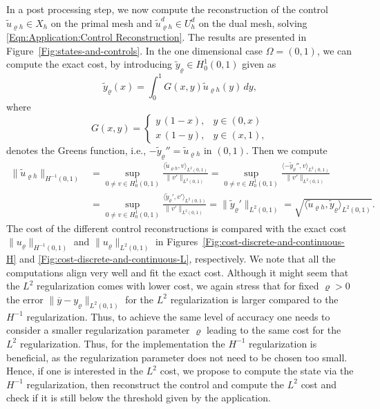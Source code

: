 \documentclass{article}
\newcommand{\norm}[1]{\|#1\|}
\numberwithin{equation}{section}
\begin{document}
In a post processing step, we now compute the reconstruction of the control
$\widetilde{u}_{\varrho h}\in X_h$ on the primal mesh and
$\widetilde{u}_{\varrho h}^d\in U_h^d$ on the
dual mesh, solving \eqref{Eqn:Application:Control Reconstruction}. The results
are presented in Figure~\ref{Fig:states-and-controls}. 
In the one dimensional case $\Omega = (0,1)$, we can compute the exact cost,
by introducing $\widetilde{y}_\varrho\in H^1_0(0,1)$ given as 
\begin{equation*}
  \widetilde{y}_\varrho(x) = \int_0^1 G(x,y)\widetilde{u}_{\varrho h}(y)\, dy, 
\end{equation*}
where
\begin{equation*}
  G(x,y) = \begin{cases}
    y \, (1-x),& y\in(0,x)\\
    x \, (1-y), & y\in(x,1),
  \end{cases}
\end{equation*}
denotes the Greens function, i.e., $-\widetilde{y}_\varrho'' =
\widetilde{u}_{\varrho h}$
in $(0,1)$. Then we compute 
\begin{align*}
  \norm{\widetilde{u}_{\varrho h}}_{H^{-1}(0,1)}
  & = \sup_{0\neq v\in H^1_0(0,1)}
    \frac{\langle \widetilde{u}_{\varrho h},v\rangle_{L^2(0,1)} }{\norm{v'}_{L^2(0,1)}}
    = \sup_{0\neq v\in H^1_0(0,1)}\frac{\langle -\widetilde{y}_\varrho'',
    v\rangle_{L^2(0,1)} }{\norm{v'}_{L^2(0,1)}}\\
  & = \sup_{0\neq v\in H^1_0(0,1)}
    \frac{\langle \widetilde{y}_\varrho',v'\rangle_{L^2(0,1)}}
    {\norm{v'}_{L^2(0,1)}}
    = \norm{\widetilde{y}_\varrho'}_{L^2(0,1)} =
    \sqrt{\langle \widetilde{u}_{\varrho h},
    \widetilde{y}_\varrho\rangle_{L^2(0,1)} }.  
\end{align*} 
The cost of the different control reconstructions is compared with the exact
cost $\norm{u_{\varrho}}_{H^{-1}(0,1)}$ and $\norm{u_\varrho}_{L^2(0,1)}$ in 
Figures~\ref{Fig:cost-discrete-and-continuous-H} and
\ref{Fig:cost-discrete-and-continuous-L}, respectively.
We note that all the computations align very well and fit the exact cost.
Although it might seem that the $L^2$ regularization comes with lower cost,
we again stress that for fixed $\varrho >0$ the error
$\norm{\overline{y}-y_{\varrho}}_{L^2(0,1)}$ for the $L^2$ regularization is
larger compared to the $H^{-1}$ regularization. Thus, to achieve the same
level of accuracy one needs to consider a smaller regularization parameter
$\varrho$ leading to the same cost for the $L^2$ regularization. Thus, for
the implementation the $H^{-1}$ regularization is beneficial, as the
regularization parameter does not need to be chosen too small. Hence, if
one is interested in the $L^2$ cost, we propose to compute the state via the
$H^{-1}$ regularization, then reconstruct the control and compute the $L^2$
cost and check if it is still below the threshold given by the application.   
\end{document}

